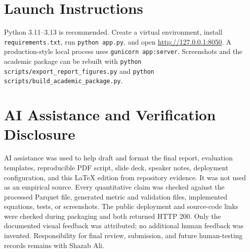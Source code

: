 \documentclass[11pt]{article}
\begin{document}
\section{Launch Instructions}
Python 3.11--3.13 is recommended. Create a virtual environment, install \texttt{requirements.txt}, run \texttt{python app.py}, and open \url{http://127.0.0.1:8050}. A production-style local process uses \texttt{gunicorn app:server}. Screenshots and the academic package can be rebuilt with \texttt{python scripts/export\_report\_figures.py} and \texttt{python scripts/build\_academic\_package.py}.

\section{AI Assistance and Verification Disclosure}
AI assistance was used to help draft and format the final report, evaluation templates, reproducible PDF script, slide deck, speaker notes, deployment configuration, and this LaTeX edition from repository evidence. It was not used as an empirical source. Every quantitative claim was checked against the processed Parquet file, generated metric and validation files, implemented equations, tests, or screenshots. The public deployment and source-code links were checked during packaging and both returned HTTP 200. Only the documented visual feedback was attributed; no additional human feedback was invented. Responsibility for final review, submission, and future human-testing records remains with Shazab Ali.

\nocite{pandas,project-repository}


\end{document}
